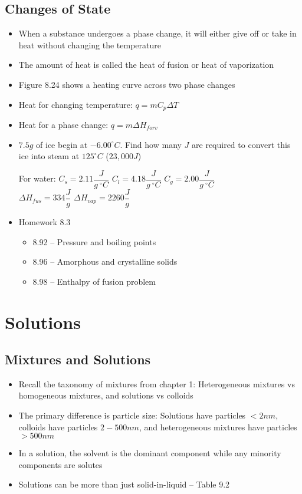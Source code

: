 \documentclass[12pt, openany, letterpaper]{memoir}
\begin{document}
\section{Changes of State}
\begin{itemize}
	\item When a substance undergoes a phase change, it will either give off or take in heat without changing the temperature
	\item The amount of heat is called the heat of fusion or heat of vaporization
	\item Figure 8.24 shows a heating curve across two phase changes
	\item Heat for changing temperature: $q=mC_p\Delta T$
	\item Heat for a phase change: $q=m\Delta H_{f or v}$
	\item $7.5g$ of ice begin at $-6.00^\circ C$. Find how many $J$ are required to convert this ice into steam at $125^\circ C$ ($23,000J$)

	      For water: $C_{s}=2.11\dfrac{J}{g~^\circ C}$ \hspace{1em} $C_{l}=4.18\dfrac{J}{g~^\circ C}$ \hspace{1em} $C_{g}=2.00\dfrac{J}{g~^\circ C}$ \\ \hphantom{For Water:} $\Delta H_{fus} = 334\dfrac{J}{g}$ \hspace{1em} $\Delta H_{vap} = 2260\dfrac{J}{g}$
	\item Homework 8.3
	      \begin{itemize}
		      \item 8.92 -- Pressure and boiling points
		      \item 8.96 -- Amorphous and crystalline solids
		      \item 8.98 -- Enthalpy of fusion problem
	      \end{itemize}
\end{itemize}

\chapter{Solutions}
\section{Mixtures and Solutions}
\begin{itemize}
	\item Recall the taxonomy of mixtures from chapter 1: Heterogeneous mixtures vs homogeneous mixtures, and solutions vs colloids
	\item The primary difference is particle size: Solutions have particles $<2nm$, colloids have particles $2-500nm$, and heterogeneous mixtures have particles $>500nm$
	\item In a solution, the solvent is the dominant component while any minority components are solutes
	\item Solutions can be more than just solid-in-liquid -- Table 9.2
\end{itemize}
\end{document}
